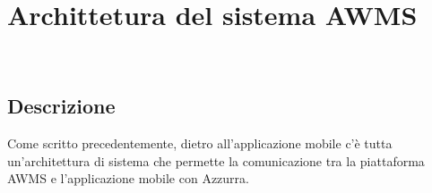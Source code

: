 \chapter{Archittetura del sistema AWMS}
\label{cap:archittettura del sistema AWMS}

\\


\section{Descrizione}
Come scritto precedentemente, dietro all'applicazione mobile c'è tutta un'architettura di sistema che permette la comunicazione tra la piattaforma \gls{AWMS} e l'applicazione mobile con Azzurra.
 
